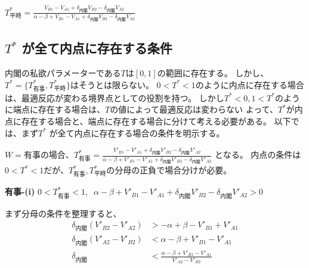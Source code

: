 \documentclass[main.tex]{subfiles}
\begin{document}
\vspace{0.5\baselineskip}

\begin{definition} \Large$T^*_{平時} = \frac{ V_{B1} - V_{A1} +\delta_{内閣}V_{B2} - \delta_{内閣}V_{A2} }{ \alpha-\beta + V_{B1}-V_{A1} + \delta_{内閣}V_{B2} - \delta_{内閣}V_{A2} }$ \end{definition}












\subsection{$T^*$ が全て内点に存在する条件}

内閣の私欲パラメーターである$T$は$[0,1]$の範囲に存在する。
しかし、$T^* = \lbrace T^*_{有事}, T^*_{平時} \rbrace$はそうとは限らない。
$0<T^*<1$のように内点に存在する場合は、最適反応が変わる境界点としての役割を持つ。
しかし$T^*<0,1<T^*$のように端点に存在する場合は、$T$の値によって最適反応は変わらない%
よって、$T^*$が内点に存在する場合と、端点に存在する場合に分けて考える必要がある。
以下では、まず$T^*$ が全て内点に存在する場合の条件を明示する。


$W=有事$の場合、$T^*_{有事} = \frac{ V'_{B1} - V'_{A1} +\delta_{内閣}V'_{B2} - \delta_{内閣}V'_{A2} }{ \alpha-\beta + V'_{B1}-V'_{A1} + \delta_{内閣}V'_{B2} - \delta_{内閣}V'_{A2} }$
となる。
内点の条件は$0<T^*<1$だが、$T^*_{有事}, T^*_{平時}$の分母の正負で場合分けが必要。

\bigskip
\noindent
\textbf{有事-(i)}\; $0<T^*_{有事}<1,\;\;\alpha-\beta + V'_{B1}-V'_{A1} + \delta_{内閣}V'_{B2} - \delta_{内閣}V'_{A2} > 0$

まず分母の条件を整理すると、
\begin{align*}
    \delta_{内閣}(V'_{B2} - V'_{A2}) &> -\alpha+\beta - V'_{B1}+V'_{A1} \\
    \delta_{内閣}(V'_{A2} - V'_{B2}) &< \alpha-\beta + V'_{B1}-V'_{A1}\\
    \delta_{内閣} &< \frac{\alpha-\beta + V'_{B1}-V'_{A1}}{V'_{A2} - V'_{B2}} 
\end{align*}
\end{document}
